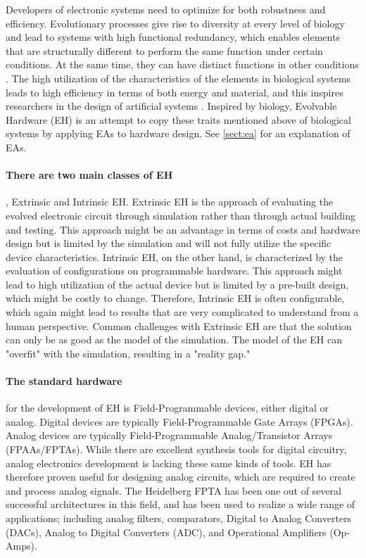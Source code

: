 Developers of electronic systems need to optimize for both robustness and efficiency\cite{mead_neuromorphic_1990}.
Evolutionary processes give rise to diversity at every level of biology and lead to systems with high functional redundancy, which enables elements that are structurally different to perform the same function under certain conditions. At the same time, they can have distinct functions in other conditions \cite{trefzer_evolvable_2015}.
The high utilization of the characteristics of the elements in biological systems leads to high efficiency in terms of both energy and material, and this inspires researchers in the design of artificial systems \cite{mead_neuromorphic_1990}.
Inspired by biology, Evolvable Hardware (EH) is an attempt to copy these traits mentioned above of biological systems by applying EAs to hardware design.
See \vref{sect:ea} for an explanation of EAs.

\paragraph{There are two main classes of EH}, Extrinsic and Intrinsic EH.
Extrinsic EH is the approach of evaluating the evolved electronic circuit through simulation rather than through actual building and testing.
This approach might be an advantage in terms of costs and hardware design but is limited by the simulation and will not fully utilize the specific device characteristics.
Intrinsic EH, on the other hand, is characterized by the evaluation of configurations on programmable hardware.
This approach might lead to high utilization of the actual device but is limited by a pre-built design, which might be costly to change.
Therefore, Intrinsic EH is often configurable, which again might lead to results that are very complicated to understand from a human perspective.
Common challenges with Extrinsic EH are that the solution can only be as good as the model of the simulation. The model of the EH can "overfit" with the simulation, resulting in a "reality gap."
\cite{haddow_challenges_2011}

\paragraph{The standard hardware} for the development of EH is Field-Programmable devices, either digital or analog.
Digital devices are typically Field-Programmable Gate Arrays (FPGAs).
Analog devices are typically Field-Programmable Analog/Transistor Arrays (FPAAs/FPTAs).
While there are excellent synthesis tools for digital circuitry, analog electronics development is lacking these same kinds of tools.
EH has therefore proven useful for designing analog circuits, which are required to create and process analog signals.
The Heidelberg FPTA has been one out of several successful architectures in this field, and has been used to realize a wide range of applications;
including analog filters, comparators, Digital to Analog Converters (DACs), Analog to Digital Converters (ADC), and Operational Amplifiers (Op-Amps)\cite{trefzer_operational_2005}.
\cite{trefzer_evolvable_2015}

